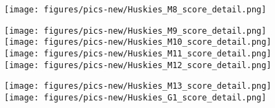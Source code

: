 \documentclass{mcmthesis}
\begin{document}
\begin{appendices}
\begin{figure}[h]
\texttt{[image: figures/pics-new/Huskies\_M8\_score\_detail.png]}
\end{figure}
\begin{figure}[h]\centering
\texttt{[image: figures/pics-new/Huskies\_M9\_score\_detail.png]}
\texttt{[image: figures/pics-new/Huskies\_M10\_score\_detail.png]}
\texttt{[image: figures/pics-new/Huskies\_M11\_score\_detail.png]}
\texttt{[image: figures/pics-new/Huskies\_M12\_score\_detail.png]}
\end{figure}
\begin{figure}[h]
\texttt{[image: figures/pics-new/Huskies\_M13\_score\_detail.png]}
\texttt{[image: figures/pics-new/Huskies\_G1\_score\_detail.png]}
\end{figure}
\end{appendices}
\end{document}
